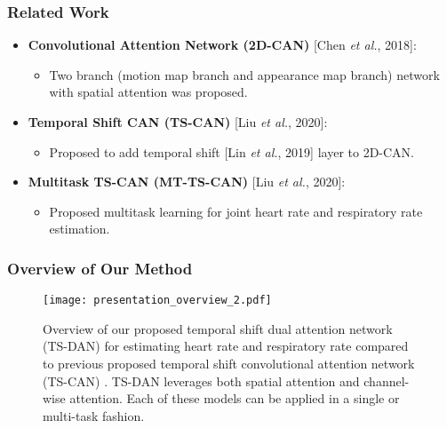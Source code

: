 \documentclass[aspectratio=169, table]{beamer}
\begin{document}
\begin{frame}
	\frametitle{\textbf{Related Work}}
	
	\begin{itemize}
		\item \textbf{Convolutional Attention Network (2D-CAN)} [Chen \textit{et al.}, 2018]: 
		\begin{itemize}\normalsize
			\item Two branch (motion map branch and appearance map branch) network with spatial attention was proposed. \\[2mm]
		\end{itemize}
		\item \textbf{Temporal Shift CAN (TS-CAN)} [Liu \textit{et al.}, 2020]:
		\begin{itemize}\normalsize
		 	\item Proposed to add temporal shift [Lin \textit{et al.}, 2019] layer to 2D-CAN. \\[2mm]
		 \end{itemize}
		\item \textbf{Multitask TS-CAN (MT-TS-CAN)} [Liu \textit{et al.}, 2020]:
		\begin{itemize}\normalsize
		 	\item Proposed multitask learning for joint heart rate and respiratory rate estimation.
		 \end{itemize}
	\end{itemize}
	
\end{frame}

\begin{frame}
\frametitle{\textbf{Overview of Our Method}}
\begin{figure}
\begin{center}
\texttt{[image: presentation\_overview\_2.pdf]}
\end{center}
\caption{Overview of our proposed temporal shift dual attention network (TS-DAN) for estimating heart rate and respiratory rate compared to previous proposed temporal shift convolutional attention network (TS-CAN) \cite{liu2020multi}. TS-DAN leverages both spatial attention and channel-wise attention. Each of these models can be applied in a single or multi-task fashion.}
\label{flow}
\end{figure}

\end{frame}
\end{document}
